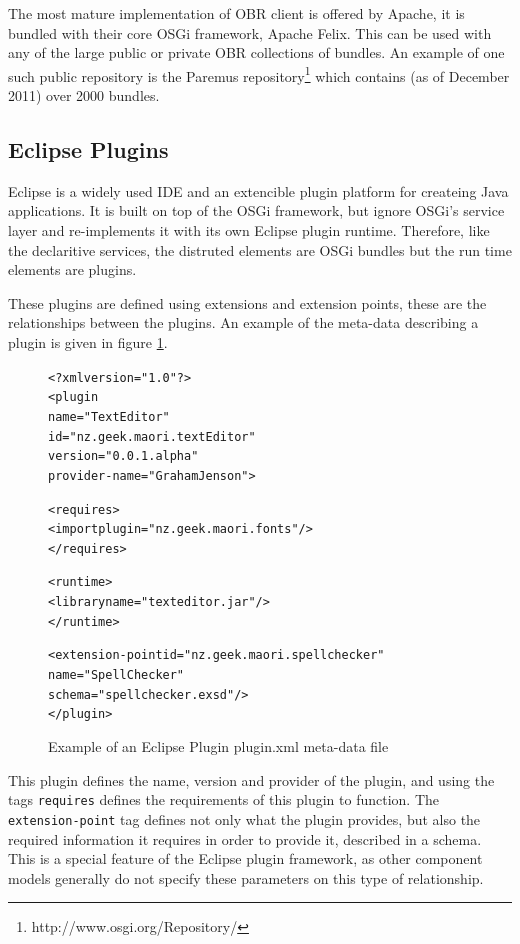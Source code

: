 The most mature implementation of OBR client is offered by Apache, it is bundled with their core OSGi framework, Apache Felix. 
This can be used with any of the large public or private OBR collections of bundles.
An example of one such public repository is the Paremus repository\footnote{http://www.osgi.org/Repository/} which contains (as of December 2011) over 2000 bundles.

\subsection{Eclipse Plugins}
Eclipse is a widely used IDE and an extencible plugin platform for createing Java applications.
It is built on top of the OSGi framework, but ignore OSGi's service layer and re-implements it with its own Eclipse plugin runtime.
Therefore, like the declaritive services, the distruted elements are OSGi bundles but the run time elements are plugins.

These plugins are defined using extensions and extension points, these are the relationships between the plugins.
An example of the meta-data describing a plugin is given in figure \ref{eclipseplugin}. 

\begin{figure}[htp]
\begin{center}
\begin{alltt}
<?xml version="1.0"?>
<plugin
    name="Text Editor"
    id="nz.geek.maori.textEditor"
    version="0.0.1.alpha"
    provider-name="Graham Jenson">
    
    <requires>
        <import plugin="nz.geek.maori.fonts"/>
    </requires>

    <runtime>
        <library name="texteditor.jar"/>
    </runtime>
    
    <extension-point id="nz.geek.maori.spellchecker" 
        name="Spell Checker" 
        schema="spellchecker.exsd"/>
</plugin>
\end{alltt}
  \caption[Eclipse Plugin meta-data]{Example of an Eclipse Plugin plugin.xml meta-data file}
  \label{eclipseplugin}
\end{center}
\end{figure}

This plugin defines the name, version and provider of the plugin, and using the tags \verb+requires+ defines the requirements of this plugin to function.
The \verb+extension-point+ tag defines not only what the plugin provides, but also the required information it requires in order to provide it, described in a schema.
This is a special feature of the Eclipse plugin framework, as other component models generally do not specify these parameters on this type of relationship. 

